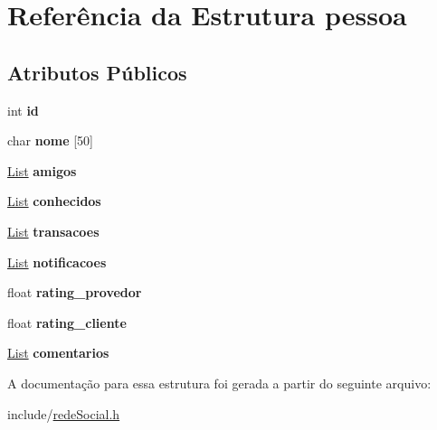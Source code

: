 \hypertarget{structpessoa}{}\section{Referência da Estrutura pessoa}
\label{structpessoa}
\subsection*{Atributos Públicos}
\begin{DoxyCompactItemize}
\item 
\mbox{\label{structpessoa_a8e80bd7d70d7d29b248ef5ec77720b5b}} 
int {\bfseries id}
\item 
\mbox{\label{structpessoa_aab3d539801c72b8740e5467b0cf86839}} 
char {\bfseries nome} \mbox{[}50\mbox{]}
\item 
\mbox{\label{structpessoa_a4eea379bf9c4b63980b2b7b9eb5523cb}} 
\hyperlink{lista_8h_a698ff83165b8296011a50bb9aba83964}{List} {\bfseries amigos}
\item 
\mbox{\label{structpessoa_a4a0912ceba3d7877996a51dcfd373ce8}} 
\hyperlink{lista_8h_a698ff83165b8296011a50bb9aba83964}{List} {\bfseries conhecidos}
\item 
\mbox{\label{structpessoa_ad9d343133c3f26aaad1b8e2656235b3d}} 
\hyperlink{lista_8h_a698ff83165b8296011a50bb9aba83964}{List} {\bfseries transacoes}
\item 
\mbox{\label{structpessoa_a62d9fd43b7e6149b1ad85c7bb1ffa5c4}} 
\hyperlink{lista_8h_a698ff83165b8296011a50bb9aba83964}{List} {\bfseries notificacoes}
\item 
\mbox{\label{structpessoa_a6aef9f983e1a00eb20e0b4227df8e963}} 
float {\bfseries rating\+\_\+provedor}
\item 
\mbox{\label{structpessoa_afee04df44de2997fa213bbdc1a24a5c0}} 
float {\bfseries rating\+\_\+cliente}
\item 
\mbox{\label{structpessoa_a04fa228b9b6f71210dae022b62fd5fab}} 
\hyperlink{lista_8h_a698ff83165b8296011a50bb9aba83964}{List} {\bfseries comentarios}
\end{DoxyCompactItemize}


A documentação para essa estrutura foi gerada a partir do seguinte arquivo\+:\begin{DoxyCompactItemize}
\item 
include/\hyperlink{redeSocial_8h}{rede\+Social.\+h}\end{DoxyCompactItemize}
